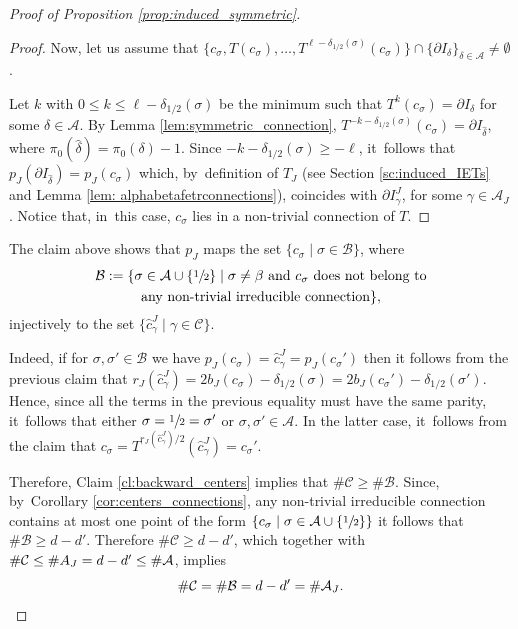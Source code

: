 \documentclass[JEP,XML,SOM,Unicode,NoEqCountersInSection,NoFloatCountersInSection,published]{cedram}
\theoremstyle{plain}
\theoremstyle{definition}
\newcommand{\A}{\mathcal{A}}
\begin{document}
\begin{proof}[Proof of Proposition \ref{prop:induced_symmetric}]
\begin{proof}
Now, let us assume that $\{c_\sigma, T(c_\sigma), \ldots, T^{\ell - \delta_{1/2}(\sigma)}(c_\sigma)\} \cap \{\partial I_\delta\}_{\delta \in \A} \neq \emptyset$.

Let $k$ with $0 \leq k \leq \ell - \delta_{1/2}(\sigma)$ be the minimum such that $T^k(c_\sigma) = \partial I _\delta$ for some $\delta \in \A$. By Lemma \ref{lem:symmetric_connection}, $T^{-k - \delta_{1/2}(\sigma)}(c_\sigma) = \partial I_{\hat \delta}$, where $\pi_0(\hat \delta) = \pi_0(\delta) - 1$. Since $-k - \delta_{1/2}(\sigma) \geq -\ell$, it~follows that $p_J(\partial I_{\hat \delta}) = p_J(c_\sigma)$ which, by~definition of $T_J$ (see Section \ref{sc:induced_IETs} and Lemma \ref{lem: alphabetafetrconnections}), coincides with $\partial I_\gamma^J$, for some $\gamma \in \A_J$. Notice that, in~this case, $c_\sigma$ lies in a non-trivial connection of $T$.
\end{proof}

The claim above shows that $p_J$ maps the set $\{c _\sigma \mid \sigma \in \mathcal B\}$, where
\begin{multline*}
\mathcal{B} := \{\sigma \in \A \cup \{\sfrac{1}{2}\} \mid \sigma \neq \beta \text{ and } c_\sigma \text{ does not belong to}\\
\text{any non-trivial irreducible connection}\},
\end{multline*}
injectively to the set $\{\hat c_\gamma^J \mid \gamma \in \mathcal C\}$.

Indeed, if for $\sigma, \sigma' \in \mathcal B$ we have $p_J(c_\sigma) = \hat c_\gamma^J = p_J(c_\sigma')$ then it follows from the previous claim that $r_J(\hat c_\gamma^J) = 2b_J(c_\sigma) - \delta_{1/2}(\sigma) = 2b_J(c_\sigma') - \delta_{1/2}(\sigma')$. Hence, since all the terms in the previous equality must have the same parity, it~follows that either $\sigma = \sfrac{1}{2} = \sigma'$ or $\sigma, \sigma' \in \A$. In the latter case, it~follows from the claim that $c_\sigma = T^{r_J( \hat c_\gamma^J)/2}(\hat c_\gamma^J) = c_\sigma'$.

Therefore, Claim \ref{cl:backward_centers} implies that $\# \mathcal C \geq \# \mathcal B$. Since, by~Corollary \ref{cor:centers_connections}, any non-trivial irreducible connection contains at most one point of the form $\{c_\sigma \mid \sigma \in \A \cup \{\sfrac{1}{2}\}\}$ it follows that $\#\mathcal B \geq d - d'$. Therefore $\#\mathcal C \geq d - d'$, which together with $\#\mathcal C\le\#\mathcal \A_J = d - d' \le\#\mathcal A$, implies
\[
\# \mathcal C = \#\mathcal B = d - d' = \# \A_J.\qedhere
\]
\end{proof}
\end{document}
